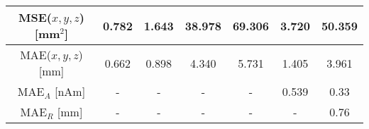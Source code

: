 \documentclass[a4paper, UKenglish, 11pt]{uiomaster}
\begin{document}
\begin{table}[]
\begin{tabular}{c|cccccc|}
\multicolumn{1}{|c|}{\cellcolor[HTML]{EFEFEF}MSE($x, y, z$) {[}mm$^2${]}}                                           & \multicolumn{1}{c|}{0.782}                                                                                & \multicolumn{1}{c|}{1.643}                                                                                 & \multicolumn{1}{c|}{38.978}                                                                              & \multicolumn{1}{c|}{69.306}                                                                             & \multicolumn{1}{c|}{3.720}                                                                                            & 50.359                                                                                       \\ \hline
\multicolumn{1}{|c|}{\cellcolor[HTML]{EFEFEF}MAE($x, y, z$) {[}mm{]}}                                               & \multicolumn{1}{c|}{0.662}                                                                                & \multicolumn{1}{c|}{0.898}                                                                                 & \multicolumn{1}{c|}{4.340}                                                                               & \multicolumn{1}{c|}{5.731}                                                                              & \multicolumn{1}{c|}{1.405}                                                                                            & 3.961                                                                                        \\ \hline
\multicolumn{1}{|c|}{\cellcolor[HTML]{EFEFEF}MAE$_A$ {[}nAm{]}}                                                 & \multicolumn{1}{c|}{-}                                                                                    & \multicolumn{1}{c|}{-}                                                                                     & \multicolumn{1}{c|}{-}                                                                                   & \multicolumn{1}{c|}{-}                                                                                  & \multicolumn{1}{c|}{0.539}                                                                                            & 0.33                                                                                         \\ \hline
\multicolumn{1}{|c|}{\cellcolor[HTML]{EFEFEF}MAE$_R$ {[}mm{]}}                                                      & \multicolumn{1}{c|}{-}                                                                                    & \multicolumn{1}{c|}{-}                                                                                     & \multicolumn{1}{c|}{-}                                                                                   & \multicolumn{1}{c|}{-}                                                                                  & \multicolumn{1}{c|}{-}                                                                                                & 0.76                                                                                         \\ \hline

\end{tabular}
\end{table}
\end{document}
